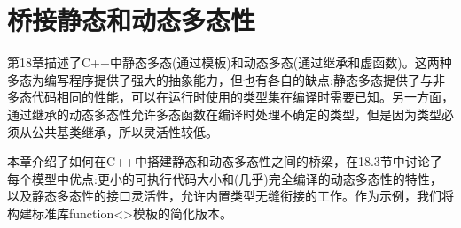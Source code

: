 \chapter{桥接静态和动态多态性}
第18章描述了C++中静态多态(通过模板)和动态多态(通过继承和虚函数)。这两种多态为编写程序提供了强大的抽象能力，但也有各自的缺点:静态多态提供了与非多态代码相同的性能，可以在运行时使用的类型集在编译时需要已知。另一方面，通过继承的动态多态性允许多态函数在编译时处理不确定的类型，但是因为类型必须从公共基类继承，所以灵活性较低。

本章介绍了如何在C++中搭建静态和动态多态性之间的桥梁，在18.3节中讨论了每个模型中优点:更小的可执行代码大小和(几乎)完全编译的动态多态性的特性，以及静态多态性的接口灵活性，允许内置类型无缝衔接的工作。作为示例，我们将构建标准库function<>模板的简化版本。






